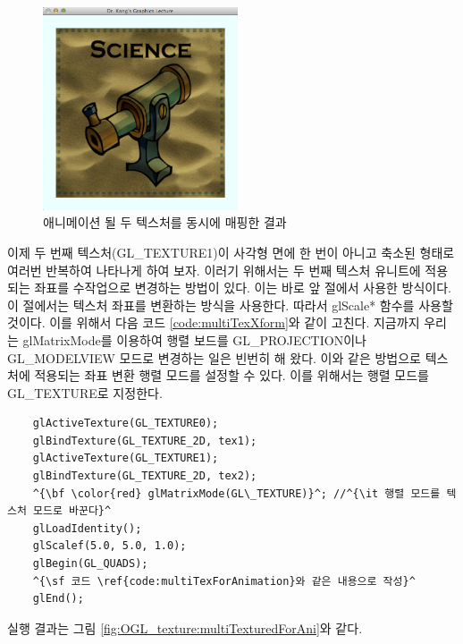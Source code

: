 \begin{figure}[h!]
  \centering
	\includegraphics[height=6cm]{OGL_texture/multiTexForAni.png} 
    \caption{애니메이션 될 두 텍스처를 동시에 매핑한 결과}
    \label{fig:OGL_texture:multiTexForAni}
\end{figure}

이제 두 번째 텍스처({\sf GL\_TEXTURE1})이 사각형 면에 한 번이 아니고 축소된 형태로 여러번 반복하여 나타나게 하여 보자. 
이러기 위해서는 두 번째 텍스처 유니트에 적용되는 좌표를 수작업으로 변경하는 방법이 있다. 이는 바로 앞 절에서 사용한 방식이다. 
이 절에서는 텍스처 좌표를 변환하는 방식을 사용한다. 따라서 {\sf glScale*} 함수를 사용할 것이다. 이를 위해서 다음 코드 \ref{code:multiTexXform}와 같이 고친다.
지금까지 우리는 {\sf glMatrixMode}를 이용하여 행렬 보드를 {\sf GL\_PROJECTION}이나 {\sf GL\_MODELVIEW} 모드로 변경하는 일은
빈번히 해 왔다. 이와 같은 방법으로 텍스처에 적용되는 좌표 변환 행렬 모드를 설정할 수 있다. 이를 위해서는 행렬 모드를 {\sf GL\_TEXTURE}로 지정한다.
\begin{algorithmbis}\label{code:multiTexXform}
\lstset{language=C++, escapechar=^} 
\begin{lstlisting}
    glActiveTexture(GL_TEXTURE0);
    glBindTexture(GL_TEXTURE_2D, tex1);
    glActiveTexture(GL_TEXTURE1);
    glBindTexture(GL_TEXTURE_2D, tex2);
    ^{\bf \color{red} glMatrixMode(GL\_TEXTURE)}^; //^{\it 행렬 모드를 텍스처 모드로 바꾼다}^
    glLoadIdentity();
    glScalef(5.0, 5.0, 1.0);    
    glBegin(GL_QUADS);
    ^{\sf 코드 \ref{code:multiTexForAnimation}와 같은 내용으로 작성}^
    glEnd();
\end{lstlisting}
\end{algorithmbis}

실행 결과는 그림 \ref{fig:OGL_texture:multiTexturedForAni}와 같다.

